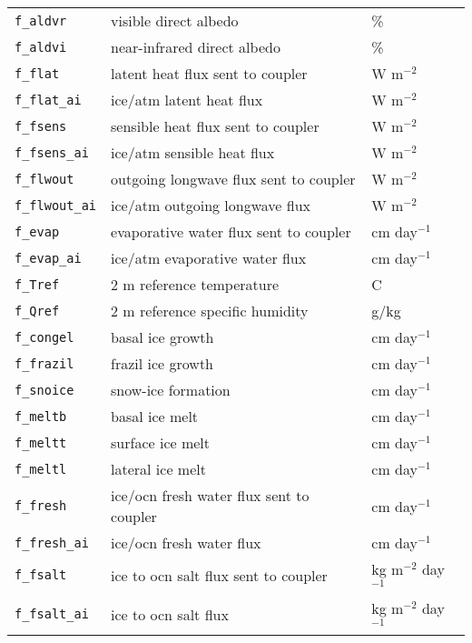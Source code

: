 \begin{center}
\begin{supertabular}{lll}
\texttt{f\_aldvr}   & visible direct albedo                & \%             \\
\texttt{f\_aldvi}   & near-infrared direct albedo          & \%             \\
\texttt{f\_flat}    & latent heat flux sent to coupler     & W m$^{-2}$     \\
\texttt{f\_flat\_ai} & ice/atm latent heat flux          & W m$^{-2}$     \\
\texttt{f\_fsens}   & sensible heat flux sent to coupler   & W m$^{-2}$     \\
\texttt{f\_fsens\_ai}& ice/atm sensible heat flux        & W m$^{-2}$     \\
\texttt{f\_flwout}  & outgoing longwave flux sent to coupler & W m$^{-2}$     \\
\texttt{f\_flwout\_ai} & ice/atm outgoing longwave flux    & W m$^{-2}$     \\
\texttt{f\_evap}    & evaporative water flux sent to coupler & cm day$^{-1}$  \\
\texttt{f\_evap\_ai} & ice/atm evaporative water flux      & cm day$^{-1}$  \\
\texttt{f\_Tref}    & 2 m reference temperature            & C              \\
\texttt{f\_Qref}    & 2 m reference specific humidity      & g/kg              \\
\texttt{f\_congel}  & basal ice growth                     & cm day$^{-1}$  \\
\texttt{f\_frazil}  & frazil ice growth                    & cm day$^{-1}$  \\
\texttt{f\_snoice}  & snow-ice formation                   & cm day$^{-1}$  \\
\texttt{f\_meltb}   & basal ice melt                       & cm day$^{-1}$  \\
\texttt{f\_meltt}   & surface ice melt                     & cm day$^{-1}$  \\
\texttt{f\_meltl}   & lateral ice melt                     & cm day$^{-1}$  \\
\texttt{f\_fresh}   & ice/ocn fresh water flux sent to coupler & cm day$^{-1}$   \\
\texttt{f\_fresh\_ai} & ice/ocn fresh water flux         & cm day$^{-1}$   \\
\texttt{f\_fsalt}   & ice to ocn salt flux sent to coupler & kg m$^{-2}$ day$^{-1}$   \\
\texttt{f\_fsalt\_ai} & ice to ocn salt flux               & kg m$^{-2}$ day$^{-1}$   \\

\end{supertabular}
\end{center}
